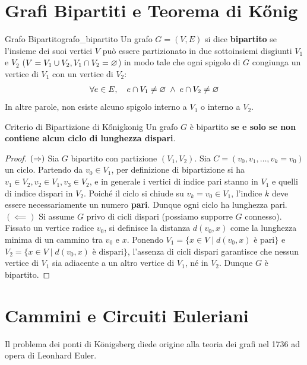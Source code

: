 \section{Grafi Bipartiti e Teorema di Kőnig}

\begin{definizione}{Grafo Bipartito}{grafo_bipartito}
Un grafo $G = (V, E)$ si dice \textbf{bipartito} se l'insieme dei suoi vertici $V$ può essere partizionato in due sottoinsiemi disgiunti $V_1$ e $V_2$ ($V = V_1 \cup V_2, V_1 \cap V_2 = \varnothing$) in modo tale che ogni spigolo di $G$ congiunga un vertice di $V_1$ con un vertice di $V_2$:
\[
    \forall e \in E, \quad e \cap V_1 \neq \varnothing \;\wedge\; e \cap V_2 \neq \varnothing
\]
In altre parole, non esiste alcuno spigolo interno a $V_1$ o interno a $V_2$.
\end{definizione}

\begin{teorema}{Criterio di Bipartizione di Kőnig}{konig}
Un grafo $G$ è bipartito \textbf{se e solo se non contiene alcun ciclo di lunghezza dispari}.
\end{teorema}
\begin{proof}
$(\Rightarrow)$ Sia $G$ bipartito con partizione $(V_1, V_2)$. Sia $C = (v_0, v_1, \dots, v_k = v_0)$ un ciclo.
Partendo da $v_0 \in V_1$, per definizione di bipartizione si ha $v_1 \in V_2, v_2 \in V_1, v_3 \in V_2$, e in generale i vertici di indice pari stanno in $V_1$ e quelli di indice dispari in $V_2$.
Poiché il ciclo si chiude su $v_k = v_0 \in V_1$, l'indice $k$ deve essere necessariamente un numero \textbf{pari}. Dunque ogni ciclo ha lunghezza pari.
$(\impliedby)$ Si assume $G$ privo di cicli dispari (possiamo supporre $G$ connesso). Fissato un vertice radice $v_0$, si definisce la distanza $d(v_0, x)$ come la lunghezza minima di un cammino tra $v_0$ e $x$. Ponendo $V_1 = \{x \in V \mid d(v_0, x) \text{ è pari}\}$ e $V_2 = \{x \in V \mid d(v_0, x) \text{ è dispari}\}$, l'assenza di cicli dispari garantisce che nessun vertice di $V_1$ sia adiacente a un altro vertice di $V_1$, né in $V_2$. Dunque $G$ è bipartito.
\end{proof}

\section{Cammini e Circuiti Euleriani}

Il problema dei ponti di Königsberg diede origine alla teoria dei grafi nel 1736 ad opera di Leonhard Euler.

